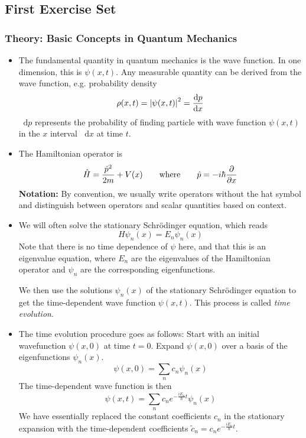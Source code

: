 \documentclass[11pt, a4paper]{article}
\newcommand{\diff}{\mathop{}\!\mathrm{d}} %
\newcommand{\eqtext}[1]{\qquad \text{#1} \qquad}
\newcommand{\schro}{Schr\"{o}dinger\xspace}
\renewcommand{\op}[1]{\hat{#1}} %
\begin{document}
\subsection{First Exercise Set}

\subsubsection{Theory: Basic Concepts in Quantum Mechanics}
\begin{itemize}
	\item The fundamental quantity in quantum mechanics is the wave function. In one dimension, this is $ \psi(x, t) $. Any measurable quantity can be derived from the wave function, e.g. probability density
	\begin{equation*}
		\rho(x, t) = \abs{\psi(x, t)}^{2} = \dv{p}{x}
	\end{equation*}
	$ \diff p $ represents the probability of finding particle with wave function $ \psi(x, t) $ in the $ x $ interval $ \diff x $ at time $ t $. 
		
	\item The Hamiltonian operator is
	\begin{equation*}
		\op{H} = \frac{\op{p}^{2}}{2m} + V(x) \eqtext{where} \op{p} = - i\hbar \pdv{}{x}
	\end{equation*}
	\textbf{Notation:} By convention, we usually write operators without the hat symbol and distinguish between operators and scalar quantities based on context.
	
	\item We will often solve the stationary \schro equation, which reads
	\begin{equation*}
		H\psi_{n}(x) = E_{n}\psi_{n}(x)
	\end{equation*}
	Note that there is no time dependence of $ \psi $ here, and that this is an eigenvalue equation, where $ E_{n} $ are the eigenvalues of the Hamiltonian operator and $ \psi_{n} $ are the corresponding eigenfunctions.
	
	We then use the solutions $ \psi_{n}(x) $ of the stationary \schro equation to get the time-dependent wave function $ \psi(x, t) $. This process is called \textit{time evolution}. 
	
	\item The time evolution procedure goes as follows: Start with an initial wavefunction $ \psi(x, 0) $ at time $ t = 0 $. Expand $ \psi(x, 0) $ over a basis of the eigenfunctions $ \psi_{n}(x) $.
	\begin{equation*}
		\psi(x, 0) = \sum_{n} c_{n} \psi_{n}(x)
	\end{equation*}
	The time-dependent wave function is then
	\begin{equation*}
		\psi(x, t) = \sum_{n} c_{n}e^{-\frac{iE_{n}}{\hbar}t}\psi_{n}(x)
	\end{equation*}
	We have essentially replaced the constant coefficients $ c_{n} $ in the stationary expansion with the time-dependent coefficients $ \tilde{c}_{n} = c_{n}e^{-\frac{iE_{n}}{\hbar}t} $.
	

\end{itemize}
\end{document}
